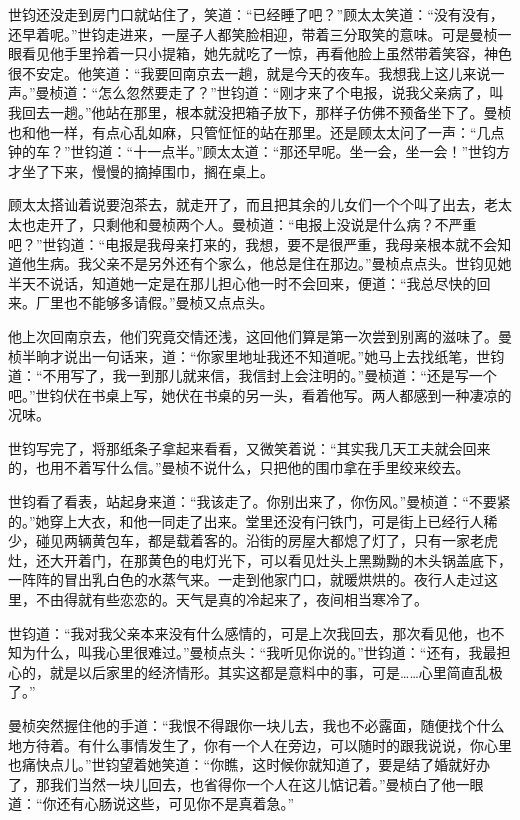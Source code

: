\par 世钧还没走到房门口就站住了，笑道：“已经睡了吧？”顾太太笑道：“没有没有，还早着呢。”世钧走进来，一屋子人都笑脸相迎，带着三分取笑的意味。可是曼桢一眼看见他手里拎着一只小提箱，她先就吃了一惊，再看他脸上虽然带着笑容，神色很不安定。他笑道：“我要回南京去一趟，就是今天的夜车。我想我上这儿来说一声。”曼桢道：“怎么忽然要走了？”世钧道：“刚才来了个电报，说我父亲病了，叫我回去一趟。”他站在那里，根本就没把箱子放下，那样子仿佛不预备坐下了。曼桢也和他一样，有点心乱如麻，只管怔怔的站在那里。还是顾太太问了一声：“几点钟的车？”世钧道：“十一点半。”顾太太道：“那还早呢。坐一会，坐一会！”世钧方才坐了下来，慢慢的摘掉围巾，搁在桌上。
\par 顾太太搭讪着说要泡茶去，就走开了，而且把其余的儿女们一个个叫了出去，老太太也走开了，只剩他和曼桢两个人。曼桢道：“电报上没说是什么病？不严重吧？”世钧道：“电报是我母亲打来的，我想，要不是很严重，我母亲根本就不会知道他生病。我父亲不是另外还有个家么，他总是住在那边。”曼桢点点头。世钧见她半天不说话，知道她一定是在那儿担心他一时不会回来，便道：“我总尽快的回来。厂里也不能够多请假。”曼桢又点点头。
\par 他上次回南京去，他们究竟交情还浅，这回他们算是第一次尝到别离的滋味了。曼桢半晌才说出一句话来，道：“你家里地址我还不知道呢。”她马上去找纸笔，世钧道：“不用写了，我一到那儿就来信，我信封上会注明的。”曼桢道：“还是写一个吧。”世钧伏在书桌上写，她伏在书桌的另一头，看着他写。两人都感到一种凄凉的况味。
\par 世钧写完了，将那纸条子拿起来看看，又微笑着说：“其实我几天工夫就会回来的，也用不着写什么信。”曼桢不说什么，只把他的围巾拿在手里绞来绞去。
\par 世钧看了看表，站起身来道：“我该走了。你别出来了，你伤风。”曼桢道：“不要紧的。”她穿上大衣，和他一同走了出来。堂里还没有闩铁门，可是街上已经行人稀少，碰见两辆黄包车，都是载着客的。沿街的房屋大都熄了灯了，只有一家老虎灶，还大开着门，在那黄色的电灯光下，可以看见灶头上黑黝黝的木头锅盖底下，一阵阵的冒出乳白色的水蒸气来。一走到他家门口，就暖烘烘的。夜行人走过这里，不由得就有些恋恋的。天气是真的冷起来了，夜间相当寒冷了。
\par 世钧道：“我对我父亲本来没有什么感情的，可是上次我回去，那次看见他，也不知为什么，叫我心里很难过。”曼桢点头：“我听见你说的。”世钧道：“还有，我最担心的，就是以后家里的经济情形。其实这都是意料中的事，可是……心里简直乱极了。”
\par 曼桢突然握住他的手道：“我恨不得跟你一块儿去，我也不必露面，随便找个什么地方待着。有什么事情发生了，你有一个人在旁边，可以随时的跟我说说，你心里也痛快点儿。”世钧望着她笑道：“你瞧，这时候你就知道了，要是结了婚就好办了，那我们当然一块儿回去，也省得你一个人在这儿惦记着。”曼桢白了他一眼道：“你还有心肠说这些，可见你不是真着急。”
